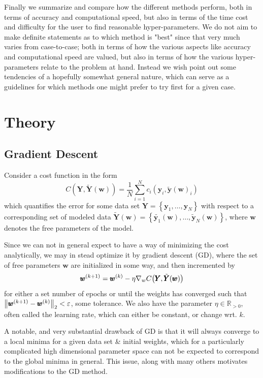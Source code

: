 \documentclass[reprint, english, nofootinbib]{revtex4-2}
\begin{document}
Finally we summarize and compare how the different methods perform, both in terms of accuracy and computational speed, but also in terms of the time cost and difficulty for the user to find reasonable hyper-parameters. We do not aim to make definite statements as to which method is "best" since that very much varies from case-to-case; both in terms of how the various aspects like accuracy and computational speed are valued, but also in terms of how the various hyper-parameters relate to the problem at hand. Instead we wish point out some tendencies of a hopefully somewhat general nature, which can serve as a guidelines for which methods one might prefer to try first for a given case.


\section{Theory}
\subsection{Gradient Descent}
\noindent
Consider a cost function in the form
\begin{equation}
    C(\pmb Y, \tilde{\pmb Y}(\pmb w)) = \frac{1}{N}\sum_{i=1}^{N}c_i(\pmb y_i, \tilde{\pmb y}(\pmb w)_i)
\end{equation}
which quantifies the error for some data set $\pmb Y = \left\{\pmb y_1, \dots, \pmb y_N\right\}$ with respect to a corresponding set of modeled data $\tilde{\pmb Y}(\pmb w) = \left\{\tilde{\pmb y_1}(\pmb w), \dots, \tilde{\pmb y}_N(\pmb w)\right\}$, where $\pmb w$ denotes the free parameters of the model.

Since we can not in general expect to have a way of minimizing the cost analytically, we may in stead optimize it by gradient descent (GD), where the set of free parameters $\pmb w$ are initialized in some way, and then incremented by
\begin{equation}\label{eqn: GD}
    \pmb w^{(k+1)} = \pmb w^{(k)} - \eta \nabla_{w}C\qty(\pmb Y, \tilde{\pmb Y}(\pmb w))
\end{equation}
for either a set number of epochs or until the weights has converged such that $\norm{\pmb w^{(k+1)} - \pmb w^{(k)}}_2< \varepsilon$, some tolerance. We also have the parameter $\eta \in \mathbb R_{>0}$, often called the learning rate, which can either be constant, or change wrt. $k$.

A notable, and very substantial drawback of GD is that it will always converge to a local minima for a given data set \& initial weights, which for a particularly complicated high dimensional parameter space can not be expected to correspond to the global minima in general. This issue, along with many others \cite[pp.15-16]{Mehta_2019} motivates modifications to the GD method.
\end{document}
